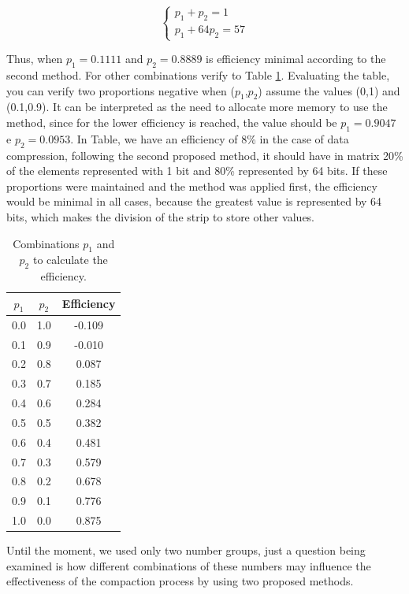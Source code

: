 \documentclass[10pt]{article}
\begin{document}
\begin{equation}\label{eq:42}
  \left
  \{\begin{matrix}
    p_1 + p_2 = 1\\ 
    p_1+64p_2 = 57
  \end{matrix}
  \right.
\end{equation}

Thus, when $p_1=0.1111$ and $p_2=0.8889$ is efficiency minimal according to the second method. For other combinations verify to Table \ref{tab:02}. Evaluating the table, you can verify two proportions negative when ($p_1$,$p_2$) assume the values ​​(0,1) and (0.1,0.9). It can be interpreted as the need to allocate more memory to use the method, since for the lower efficiency is reached, the value should be $p_1=0.9047$ e $p_2=0.0953$. In Table, we have an efficiency of 8\% ​​in the case of data compression, following the second proposed method, it should have in matrix 20\% of the elements represented with 1 bit and 80\% represented by 64 bits. If these proportions were maintained and the method was applied first, the efficiency would be minimal in all cases, because the greatest value is represented by 64 bits, which makes the division of the strip to store other values​​.

\begin{table}[h]
 \centering
 \caption{Combinations $p_1$ and $p_2$ to calculate the efficiency.}
 \begin{tabular}{ccc}
  \hline 
  $p_1$  & $p_2$ & Efficiency \\
  \hline
  0.0	&1.0    &-0.109 \\
  0.1	&0.9	&-0.010 \\
  0.2	&0.8	&0.087 \\
  0.3	&0.7	&0.185 \\
  0.4	&0.6	&0.284 \\
  0.5	&0.5	&0.382 \\
  0.6	&0.4	&0.481 \\
  0.7	&0.3	&0.579 \\ 
  0.8	&0.2	&0.678 \\
  0.9	&0.1	&0.776 \\ 
  1.0	&0.0	&0.875 \\
  \hline
 \end{tabular}
 \label{tab:02}
\end{table}

Until the moment, we used only two number groups, just a question being examined is how different combinations of these numbers may influence the effectiveness of the compaction process by using two proposed methods.
\end{document}
